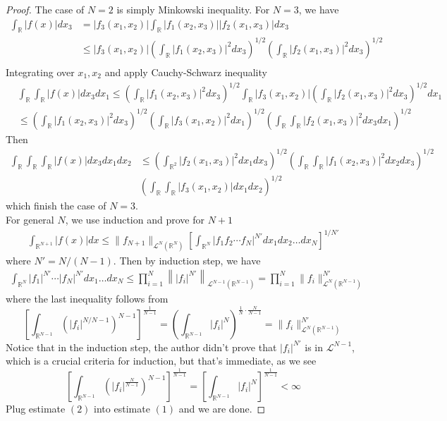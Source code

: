 \documentclass{article}
\begin{document}
\begin{proof}
    The case of $N=2$ is simply Minkowski inequality. For $N=3$, we have 
    \begin{align*}
        \int_{\mathbb{R}}|f(x)|dx_3 &= |f_{3}(x_1, x_2)|\int_{\mathbb{R}}|f_1(x_2, x_3)||f_{2}(x_1, x_3)|dx_3  \\
        &\leq |f_3(x_1, x_2)|\left(\int_{\mathbb{R}}|f_{1}(x_2, x_3)|^2dx_3\right)^{1/2}\left(\int_{\mathbb{R}}|f_{2}(x_1, x_3)|^2dx_3\right)^{1/2} \\
    \end{align*}
    Integrating over $x_1, x_2$ and apply Cauchy-Schwarz inequality
    \begin{align*}
    &\int_{\mathbb{R}}\int_{\mathbb{R}}|f(x)|dx_3dx_1\leq \left(\int_{\mathbb{R}}|f_{1}(x_2, x_3)|^2dx_3\right)^{1/2}\int_\mathbb{R}|f_3(x_1, x_2)|\left(\int_{\mathbb{R}}|f_{2}(x_1, x_3)|^2dx_3\right)^{1/2}dx_1 \\
    &\leq \left(\int_{\mathbb{R}}|f_{1}(x_2, x_3)|^2dx_3\right)^{1/2}\left(\int_{\mathbb{R}}|f_3(x_1, x_2)|^2dx_1\right)^{1/2}\left(\int_{\mathbb{\mathbb{R}}}\int_{\mathbb{R}}|f_2(x_1, x_3)|^2dx_3dx_1\right)^{1/2}
    \end{align*}
    Then 
    \begin{align*}
    \int_{\mathbb{R}}\int_{\mathbb{R}}\int_{\mathbb{R}}|f(x)|dx_3dx_1dx_2&\leq\left(\int_{\mathbb{R}^2}|f_2(x_1, x_3)|^2dx_1dx_3\right)^{1/2}\left(\int_{\mathbb{R}}\int_{\mathbb{R}}|f_1(x_2, x_3)|^2dx_2dx_3\right)^{1/2} \\
    &\left(\int_{\mathbb{R}}\int_{\mathbb{R}}|f_3(x_1, x_2)|dx_1dx_2\right)^{1/2}
    \end{align*} which finish the case of $N=3$. \\
    For general $N$, we use induction and prove for $N+1$
    \begin{align}
    \int_{\mathbb{R}^{N+1}}|f(x)|dx\leq \|f_{N+1}\|_{\mathscr{L}^N(\mathbb{R}^N)}\left[\int_{\mathbb{R}^N}|f_{1}f_{2}\cdots f_{N}|^{N'}dx_1dx_2\dots dx_N\right]^{1/N'}
    \end{align}
    where $N'=N/(N-1)$. Then by induction step, we have
    \begin{align}
    \int_{\mathbb{R}^N}|f_1|^{N'}\cdots|f_N|^{N'}dx_1\dots dx_N\leq \prod_{i=1}^{N}\left\||f_{i}|^{N'}\right\|_{\mathscr{L}^{N-1}(\mathbb{R}^{N-1})}=\prod_{i=1}^{N}\|f_{i}\|^{N'}_{\mathscr{L}^{N}(\mathbb{R}^{N-1})}
    \end{align}
    where the last inequality follows from 
    $$
    \left[\int_{\mathbb{R}^{N-1}}\left(|f_i|^{N/N-1}\right)^{N-1}\right]^{\frac{1}{N-1}}=\left(\int_{\mathbb{R}^{N-1}}|f_i|^{N}\right)^{\frac{1}{N}\cdot\frac{N}{N-1}}=\|f_i\|_{\mathscr{L}^{N}(\mathbb{R}^{N-1})}^{N'}
    $$
    \indent Notice that in the induction step, the author didn't prove that $|f_i|^{N'}$ is in $\mathscr{L}^{N-1}$, which is a crucial criteria for induction, but that's immediate, as we see
    $$
    \left[\int_{\mathbb{R}^{N-1}}\left(|f_i|^{\frac{N}{N-1}}\right)^{N-1}\right]^{\frac{1}{N-1}}=\left[\int_{\mathbb{R}^{N-1}}|f_i|^N\right]^{\frac{1}{N-1}}<\infty
    $$
    Plug estimate $(2)$ into estimate $(1)$ and we are done.
\end{proof} 
\end{document}

